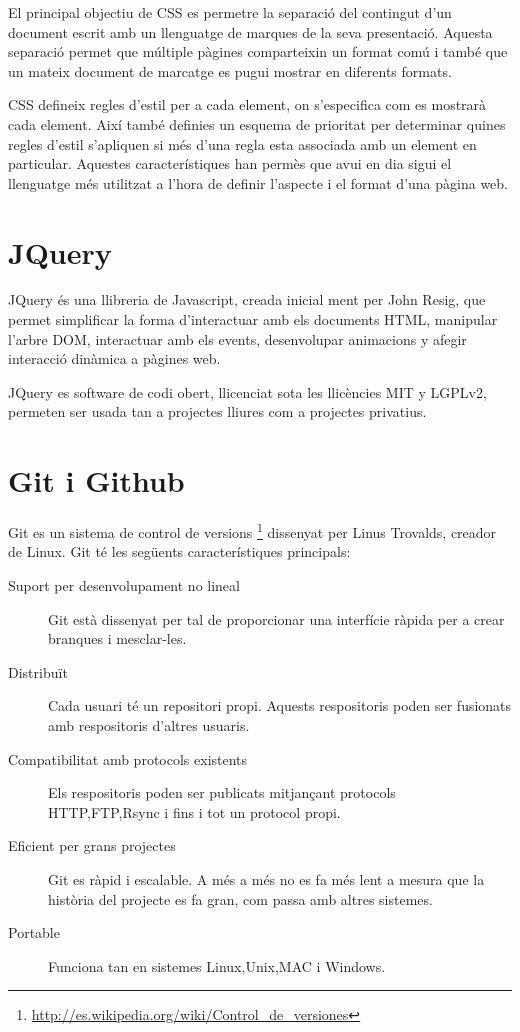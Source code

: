 El principal objectiu de CSS es permetre la separació del contingut d'un document escrit amb un llenguatge de marques de la seva presentació. Aquesta separació permet que múltiple pàgines comparteixin un format comú i també que un mateix document de marcatge es pugui mostrar en diferents formats. 

CSS defineix regles d'estil per a cada element, on s'especifica com es mostrarà cada element. Així també definies un esquema de prioritat per determinar quines regles d'estil s'apliquen si més d'una regla esta associada amb un element en particular. Aquestes característiques han permès que avui en dia sigui el llenguatge més utilitzat a l'hora de definir l'aspecte i el format d'una pàgina web. 

\section{JQuery}

JQuery és una llibreria de Javascript, creada inicial ment per John Resig, que permet simplificar la forma d'interactuar amb els documents HTML, manipular l'arbre DOM, interactuar amb els events, desenvolupar animacions y afegir interacció dinàmica a pàgines web. 

JQuery es software de codi obert, llicenciat sota les llicències MIT y LGPLv2, permeten ser usada tan a projectes lliures com a projectes privatius. 

\section{Git i Github}

Git es un sistema de control de versions \footnote{\url{http://es.wikipedia.org/wiki/Control_de_versiones}} dissenyat per Linus Trovalds, creador de Linux. Git té les següents característiques principals: 

\begin{description}
    \item[Suport per desenvolupament no lineal] Git està dissenyat per tal de proporcionar una interfície ràpida per a crear branques i mesclar-les.
    \item[Distribuït] Cada usuari té un repositori propi. Aquests respositoris poden ser fusionats amb respositoris d'altres usuaris.
    \item[Compatibilitat amb protocols existents] Els respositoris poden ser publicats mitjançant protocols HTTP,FTP,Rsync i fins i tot un protocol propi.
    \item[Eficient per grans projectes] Git es ràpid i escalable. A més a més no es fa més lent a mesura que la història del projecte es fa gran, com passa amb altres sistemes.
    \item[Portable] Funciona tan en sistemes Linux,Unix,MAC i Windows.
\end{description}

